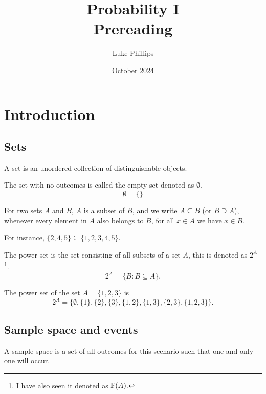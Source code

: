 \documentclass[10pt, a4paper]{article}
\title{Probability I \\
    \large Prereading}
\author{Luke Phillips}
\date{October 2024}
\begin{document}
\maketitle

\newpage

\section{Introduction}

\subsection{Sets}

A set is an unordered collection of distinguishable objects. 

\begin{definition}
    The set with no outcomes is called the empty set denoted as $\emptyset$.
    \[
    \emptyset = \{\}
    \]
\end{definition}

\begin{definition}[Subset]
    For two sets $A$ and $B$, $A$ is a subset of $B$, and we write $A \subseteq B$ (or $B \supseteq A$), whenever every element in $A$ also belongs to $B$, for all $x \in A$ we have $x \in B$.
\end{definition}

\begin{example}
    For instance, $\{2, 4, 5\} \subseteq \{1, 2, 3, 4, 5\}$.    
\end{example}

\begin{definition}
    The power set is the set consisting of all subsets of a set $A$, this is denoted as $2 ^ A$\footnote{I have also seen it denoted as $\P(A)$.}.
    \[
    2 ^ A = \{B: B \subseteq A\}.
    \]
\end{definition}

\begin{example}
    The power set of the set $A = \{1, 2, 3\}$ is
    \[
    2 ^ A = \{\emptyset, \{1\}, \{2\}, \{3\}, \{1, 2\}, \{1, 3\}, \{2, 3\}, \{1, 2, 3\}\}.
    \]
\end{example}

\subsection{Sample space and events}
A sample space is a set of all outcomes for this scenario such that one and only one will occur.
\end{document}
